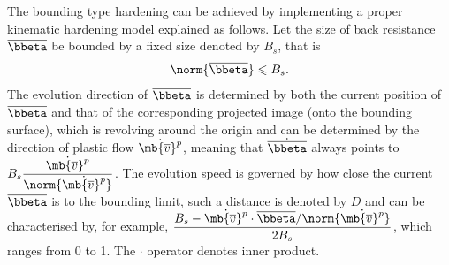 The bounding type hardening can be achieved by implementing a proper kinematic hardening model explained as follows. Let the size of back resistance $\overline{\bbeta}$ be bounded by a fixed size denoted by $B_s$, that is
\begin{gather}
\norm{\overline{\bbeta}}\leqslant{}B_s.
\end{gather}
The evolution direction of $\overline{\bbeta}$ is determined by both the current position of $\overline{\bbeta}$ and that of the corresponding projected image (onto the bounding surface), which is revolving around the origin and can be determined by the direction of plastic flow $\dot{\mb{\overline{v}}^p}$, meaning that $\dot{\overline{\bbeta}}$ always points to $B_s\dfrac{\dot{\mb{\overline{v}}^p}}{\norm{\dot{\mb{\overline{v}}^p}}}$. The evolution speed is governed by how close the current $\overline{\bbeta}$ is to the bounding limit, such a distance is denoted by $D$ and can be characterised by, for example, $\dfrac{B_s-\dot{\mb{\overline{v}}^p}\cdot\overline{\bbeta}/\norm{\dot{\mb{\overline{v}}^p}}}{2B_s}$, which ranges from \num{0} to \num{1}. The $\cdot$ operator denotes inner product.

